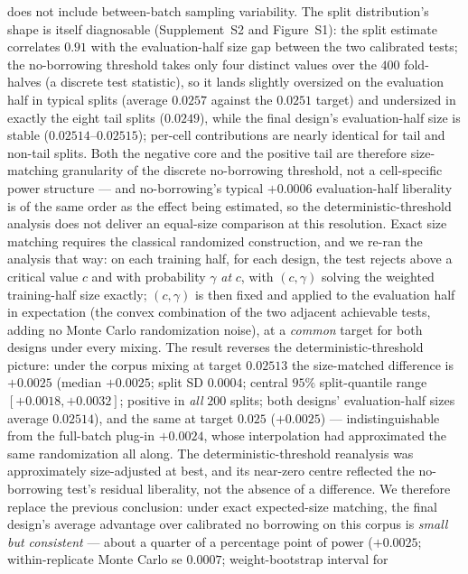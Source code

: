 \documentclass[11pt]{article}
\begin{document}
does not include between-batch sampling variability. The split
distribution's shape is itself diagnosable (Supplement~S2 and
Figure~S1): the split estimate correlates $0.91$ with the
evaluation-half size gap between the two calibrated tests; the
no-borrowing threshold takes only four distinct values over the $400$
fold-halves (a discrete test statistic), so it lands slightly oversized
on the evaluation half in typical splits (average $0.0257$ against the
$0.0251$ target) and undersized in exactly the eight tail splits
($0.0249$), while the final design's evaluation-half size is stable
($0.02514$--$0.02515$); per-cell contributions are nearly identical for
tail and non-tail splits. Both the negative core and the positive tail
are therefore size-matching granularity of the discrete no-borrowing
threshold, not a cell-specific power structure --- and no-borrowing's
typical $+0.0006$ evaluation-half liberality is of the same order as
the effect being estimated, so the deterministic-threshold analysis
does not deliver an equal-size comparison at this resolution. Exact
size matching requires the classical randomized construction, and we
re-ran the analysis that way: on each training half, for each design,
the test rejects above a critical value $c$ and with probability
$\gamma$ \emph{at} $c$, with $(c, \gamma)$ solving the weighted
training-half size exactly; $(c, \gamma)$ is then fixed and applied to
the evaluation half in expectation (the convex combination of the two
adjacent achievable tests, adding no Monte Carlo randomization noise),
at a \emph{common} target for both designs under every mixing. The
result reverses the deterministic-threshold picture: under the corpus
mixing at target $0.02513$ the size-matched difference is $+0.0025$
(median $+0.0025$; split SD $0.0004$; central $95\%$ split-quantile
range $[+0.0018, +0.0032]$; positive in \emph{all} $200$ splits; both
designs' evaluation-half sizes average $0.02514$), and the same at
target $0.025$ ($+0.0025$) --- indistinguishable from the full-batch
plug-in $+0.0024$, whose interpolation had approximated the same
randomization all along. The deterministic-threshold reanalysis was
approximately size-adjusted at best, and its near-zero centre reflected
the no-borrowing test's residual liberality, not the absence of a
difference. We therefore replace the previous conclusion: under exact
expected-size matching, the final design's average advantage over
calibrated no borrowing on this corpus is \emph{small but consistent}
--- about a quarter of a percentage point of power ($+0.0025$;
within-replicate Monte Carlo se $0.0007$; weight-bootstrap interval for
\end{document}
